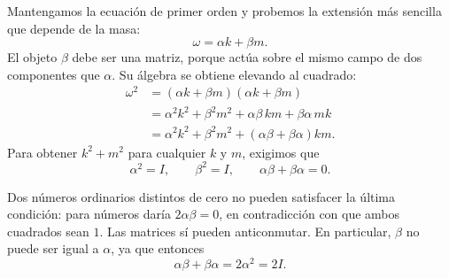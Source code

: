 Mantengamos la ecuación de primer orden y probemos la extensión más sencilla que depende de la masa:
\begin{equation}
\omega=\alpha k+\beta m.
\end{equation}
El objeto \(\beta\) debe ser una matriz, porque actúa sobre el mismo campo de dos componentes que \(\alpha\). Su álgebra se obtiene elevando al cuadrado:
\begin{align}
\omega^2
&=(\alpha k+\beta m)(\alpha k+\beta m)\\
&=\alpha^2k^2+\beta^2m^2
+\alpha\beta\,km+\beta\alpha\,mk\\
&=\alpha^2k^2+\beta^2m^2
+(\alpha\beta+\beta\alpha)km.
\end{align}
Para obtener \(k^2+m^2\) para cualquier \(k\) y \(m\), exigimos que
\begin{equation}
\alpha^2=I,
\qquad
\beta^2=I,
\qquad
\alpha\beta+\beta\alpha=0.
\end{equation}

Dos números ordinarios distintos de cero no pueden satisfacer la última condición: para números daría \(2\alpha\beta=0\), en contradicción con que ambos cuadrados sean \(1\). Las matrices sí pueden anticonmutar. En particular, \(\beta\) no puede ser igual a \(\alpha\), ya que entonces
\begin{equation}
\alpha\beta+\beta\alpha=2\alpha^2=2I.
\end{equation}

